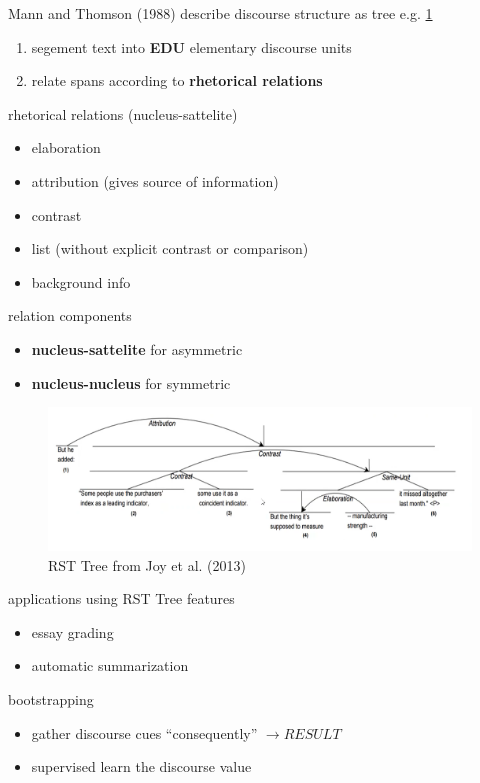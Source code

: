 \documentclass[]{article}
\theoremstyle{definition}
\begin{document}
Mann and Thomson (1988) describe discourse structure as tree e.g. \ref{fig:rst-tree}
\begin{enumerate}
    \item segement text into \textbf{EDU} elementary discourse units
    \item relate spans according to \textbf{rhetorical relations}
\end{enumerate}

rhetorical relations (nucleus-sattelite)
\begin{itemize}
    \item elaboration
    \item attribution (gives source of information)
    \item contrast
    \item list (without explicit contrast or comparison)
    \item background info
\end{itemize}

relation components
\begin{itemize}
    \item \textbf{nucleus-sattelite} for asymmetric
    \item \textbf{nucleus-nucleus} for symmetric
\end{itemize}

\begin{figure}[ht]
    \centering
    \includegraphics[width=0.8\linewidth]{comp550/rst-tree.png}
    \caption{RST Tree from Joy et al. (2013)}%
    \label{fig:rst-tree}
\end{figure}

applications using RST Tree features
\begin{itemize}
    \item essay grading
    \item automatic summarization
\end{itemize}

bootstrapping
\begin{itemize}
    \item gather discourse cues ``consequently'' $\to RESULT$
    \item supervised learn the discourse value
\end{itemize}
\end{document}
